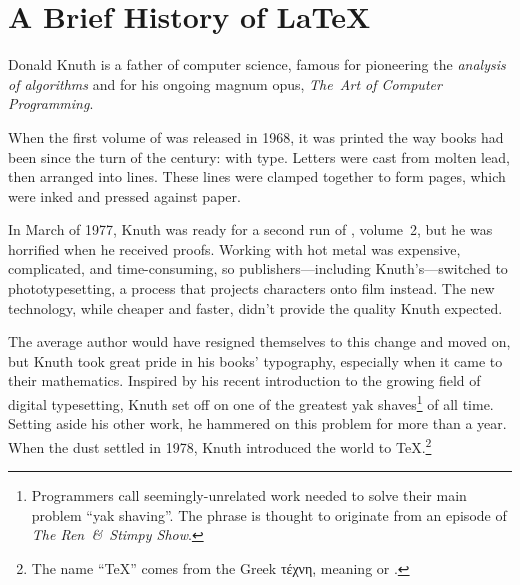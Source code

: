 \chapter{A Brief History of \texorpdfstring{\LaTeX}{LaTeX}}

\label{history}

Donald Knuth is a father of computer science,
famous for pioneering the \emph{analysis of algorithms}
and for his ongoing magnum opus,
\textit{The~Art of Computer Programming}.

When the first volume of  was released in 1968,
it was printed the way books had been since the turn of the century:
with  type.
Letters were cast from molten lead,
then arranged into lines.
These lines were clamped together to form pages,
which were inked and pressed against paper.

In March of 1977, Knuth was ready for a second run of , volume~2,
but he was horrified when he received proofs.
Working with hot metal was expensive, complicated, and time-consuming,
so publishers---including Knuth's---switched to phototypesetting,
a process that projects characters onto film instead.
The new technology, while cheaper and faster,
didn't provide the quality Knuth
expected.\punckern{}

The average author would have resigned themselves to this change and moved on,
but Knuth took great pride in his books' typography,
especially when it came to their mathematics.
Inspired by his recent introduction to the growing field of digital typesetting,
Knuth set off on one of the greatest yak shaves\footnote{Programmers
call seemingly-unrelated work needed to solve their main problem
``yak shaving''\quotekern. The phrase is thought to originate from an episode
of \textit{The Ren~\&~Stimpy Show}.\punckern{}}
of all time.
Setting aside his other work, he hammered on this problem for more than a year.
When the dust settled in 1978, Knuth introduced the world to
\TeX.\punckern\footnote{The name ``\TeX{}'' comes from the Greek
{τέχνη},
meaning  or .\punckern{}}


